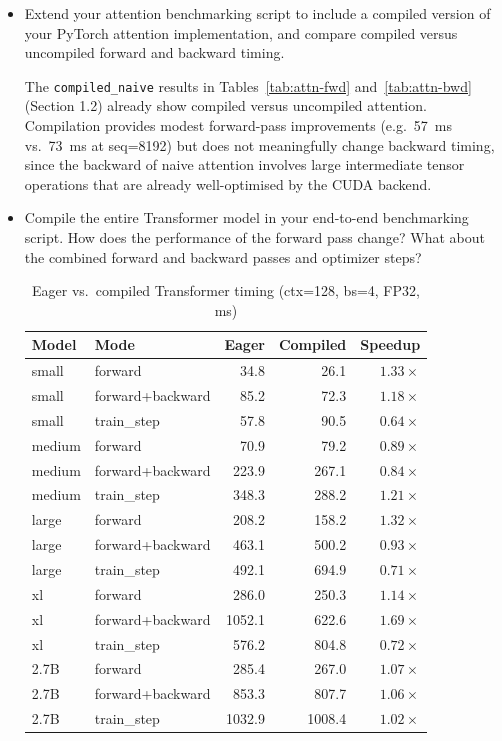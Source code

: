 \documentclass[letterpaper]{article}
\begin{document}
	\begin{itemize}
		\item[(a)] Extend your attention benchmarking script to include a compiled version of your PyTorch attention implementation, and compare compiled versus uncompiled forward and backward timing.
		
		The \texttt{compiled\_naive} results in Tables~\ref{tab:attn-fwd} and~\ref{tab:attn-bwd} (Section 1.2) already show compiled versus uncompiled attention. Compilation provides modest forward-pass improvements (e.g.\ 57~ms vs.\ 73~ms at seq=8192) but does not meaningfully change backward timing, since the backward of naive attention involves large intermediate tensor operations that are already well-optimised by the CUDA backend.
		
		\item[(b)] Compile the entire Transformer model in your end-to-end benchmarking script. How does the performance of the forward pass change? What about the combined forward and backward passes and optimizer steps?
		
		\begin{table}[H]
			\centering
			\caption{Eager vs.\ compiled Transformer timing (ctx=128, bs=4, FP32, ms)}
			\label{tab:compile-model}
			\begin{tabular}{llrrr}
				\hline
				Model & Mode & Eager & Compiled & Speedup \\
				\hline
				small  & forward          &  34.8 &  26.1 & $1.33\times$ \\
				small  & forward+backward &  85.2 &  72.3 & $1.18\times$ \\
				small  & train\_step       &  57.8 &  90.5 & $0.64\times$ \\
				medium & forward          &  70.9 &  79.2 & $0.89\times$ \\
				medium & forward+backward & 223.9 & 267.1 & $0.84\times$ \\
				medium & train\_step       & 348.3 & 288.2 & $1.21\times$ \\
				large  & forward          & 208.2 & 158.2 & $1.32\times$ \\
				large  & forward+backward & 463.1 & 500.2 & $0.93\times$ \\
				large  & train\_step       & 492.1 & 694.9 & $0.71\times$ \\
				xl     & forward          & 286.0 & 250.3 & $1.14\times$ \\
				xl     & forward+backward &1052.1 & 622.6 & $1.69\times$ \\
				xl     & train\_step       & 576.2 & 804.8 & $0.72\times$ \\
				2.7B   & forward          & 285.4 & 267.0 & $1.07\times$ \\
				2.7B   & forward+backward & 853.3 & 807.7 & $1.06\times$ \\
				2.7B   & train\_step       &1032.9 &1008.4 & $1.02\times$ \\
				\hline
			\end{tabular}
		\end{table}
		

\end{itemize}
\end{document}
